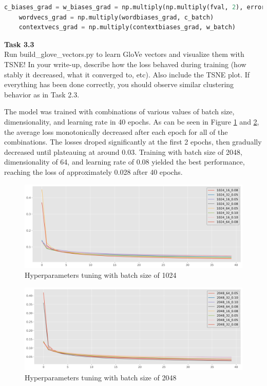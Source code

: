 \documentclass[12pt,article]{article}
\newenvironment{task}[2][Task]
    { \begin{mdframed}[backgroundcolor=gray!20] \textbf{#1 #2} \\}
    {  \end{mdframed}}
\begin{document}
\small{
\begin{lstlisting}[language=Python]
    c_biases_grad = w_biases_grad = np.multiply(np.multiply(fval, 2), error)
    wordvecs_grad = np.multiply(wordbiases_grad, c_batch)
    contextvecs_grad = np.multiply(contextbiases_grad, w_batch)
\end{lstlisting}
}

\newpage
\begin{task}{3.3} 
Run build\_glove\_vectors.py to learn GloVe vectors and visualize them with TSNE! In your write-up, describe how the loss behaved during training (how stably it decreased, what it converged to, etc). Also include the TSNE plot. If everything has been done correctly, you should observe similar clustering behavior as in Task 2.3.
\end{task}

The model was trained with combinations of various values of batch size, dimensionality, and learning rate in 40 epochs. As can be seen in Figure \ref{fig:q3-hyperparameters-b1024} and \ref{fig:q3-hyperparameters-b2048}, the average loss monotonically decreased after each epoch for all of the combinations. The losses droped significantly at the first 2 epochs, then gradually decreased until plateauing at around 0.03. Training with batch size of 2048, dimensionality of 64, and learning rate of 0.08 yielded the best performance, reaching the loss of approximately 0.028 after 40 epochs.

\begin{figure}[H]
    \centering
    \includegraphics[scale=0.5]{glove_tuning_1024.png} \par
    \caption{Hyperparameters tuning with batch size of 1024}
    \label{fig:q3-hyperparameters-b1024}
\end{figure}

\begin{figure}[H]
    \centering
    \includegraphics[scale=0.5]{glove_tuning_2048.png} \par
    \caption{Hyperparameters tuning with batch size of 2048}
    \label{fig:q3-hyperparameters-b2048}
\end{figure}
\end{document}
